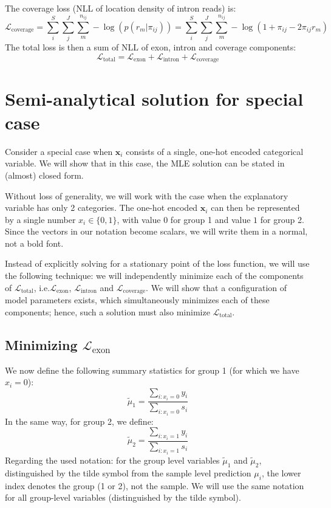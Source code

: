 \documentclass{article}
\begin{document}
	The coverage loss (NLL of location density of intron reads) is:
	$$
	\mathcal{L}_{\text{coverage}} = \sum_{i}^{S}  \sum_{j}^{J} \sum_{m}^{n_{ij}} -\log \left( p(r_m|\pi_{ij})\right) = \sum_{i}^{S}  \sum_{j}^{J} \sum_{m}^{n_{ij}} -\log \left( 
	1+\pi_{ij}-2\pi_{ij}r_m \right)
	$$
	The total loss is then a sum of NLL of exon, intron and coverage components:
	$$
	\mathcal{L}_{\text{total}} = \mathcal{L}_{\text{exon}} + \mathcal{L}_{\text{intron}} + \mathcal{L}_{\text{coverage}}
	$$
	
	\section{Semi-analytical solution for special case}
	Consider a special case when $\mathbf{x}_i$ consists of a single, one-hot encoded categorical variable. We will show that in this case, the MLE solution can be stated in (almost) closed form.
	
	Without loss of generality, we will work with the case when the explanatory variable has only 2 categories. The one-hot encoded $\mathbf{x}_i$ can then be represented by a single number $x_i \in \{0,1\}$, with value $0$ for group 1 and value $1$ for group 2. Since the vectors in our notation become scalars, we will write them in a normal, not a bold font.
	
	Instead of explicitly solving for a stationary point of the loss function, we will use the
	following technique: we will independently minimize each of the components of $\mathcal{L}_{\text{total}}$, i.e.$ \mathcal{L}_{\text{exon}}$, $\mathcal{L}_{\text{intron}}$ and $\mathcal{L}_{\text{coverage}}$. We will show that a configuration of model parameters exists, which simultaneously minimizes each of these components; hence, such a solution must also minimize $\mathcal{L}_{\text{total}}$.
	
	
	\subsection{Minimizing $\mathcal{L}_{\text{exon}}$}
	
	We now define the following summary statistics for group 1 (for which we have $x_i=0$):	
	$$
	\tilde{\mu}_1 = \frac{\sum_{i: x_i=0} y_i}{\sum_{i: x_i=0} s_i}  
	$$
	In the same way, for group 2, we define:
	$$
	\tilde{\mu}_2 = \frac{\sum_{i: x_i=1} y_i}{\sum_{i: x_i=1} s_i}  
	$$
	Regarding the used notation: for the group level variables $\tilde{\mu}_1$ and $\tilde{\mu}_2$, distinguished by the tilde symbol from the sample level prediction $\mu_i$, the lower index denotes the group (1 or 2), not the sample. We will use the same notation for all group-level variables (distinguished by the tilde symbol).
	
\end{document}
